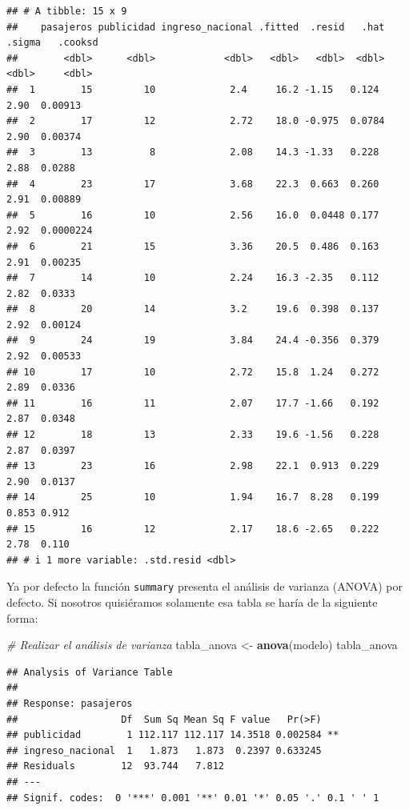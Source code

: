 \documentclass[
]{book}
\newenvironment{Shaded}{\begin{snugshade}}{\end{snugshade}}
\newcommand{\CommentTok}[1]{\textcolor[rgb]{0.56,0.35,0.01}{\textit{#1}}}
\newcommand{\FunctionTok}[1]{\textcolor[rgb]{0.13,0.29,0.53}{\textbf{#1}}}
\newcommand{\NormalTok}[1]{#1}
\newcommand{\OtherTok}[1]{\textcolor[rgb]{0.56,0.35,0.01}{#1}}
\begin{document}
\begin{verbatim}
## # A tibble: 15 x 9
##    pasajeros publicidad ingreso_nacional .fitted  .resid   .hat .sigma   .cooksd
##        <dbl>      <dbl>            <dbl>   <dbl>   <dbl>  <dbl>  <dbl>     <dbl>
##  1        15         10             2.4     16.2 -1.15   0.124   2.90  0.00913  
##  2        17         12             2.72    18.0 -0.975  0.0784  2.90  0.00374  
##  3        13          8             2.08    14.3 -1.33   0.228   2.88  0.0288   
##  4        23         17             3.68    22.3  0.663  0.260   2.91  0.00889  
##  5        16         10             2.56    16.0  0.0448 0.177   2.92  0.0000224
##  6        21         15             3.36    20.5  0.486  0.163   2.91  0.00235  
##  7        14         10             2.24    16.3 -2.35   0.112   2.82  0.0333   
##  8        20         14             3.2     19.6  0.398  0.137   2.92  0.00124  
##  9        24         19             3.84    24.4 -0.356  0.379   2.92  0.00533  
## 10        17         10             2.72    15.8  1.24   0.272   2.89  0.0336   
## 11        16         11             2.07    17.7 -1.66   0.192   2.87  0.0348   
## 12        18         13             2.33    19.6 -1.56   0.228   2.87  0.0397   
## 13        23         16             2.98    22.1  0.913  0.229   2.90  0.0137   
## 14        25         10             1.94    16.7  8.28   0.199   0.853 0.912    
## 15        16         12             2.17    18.6 -2.65   0.222   2.78  0.110    
## # i 1 more variable: .std.resid <dbl>
\end{verbatim}

Ya por defecto la función \texttt{summary} presenta el análisis de varianza (ANOVA) por defecto. Si nosotros quisiéramos solamente esa tabla se haría de la siguiente forma:

\begin{Shaded}
\begin{Highlighting}[]
\CommentTok{\# Realizar el análisis de varianza}
\NormalTok{tabla\_anova }\OtherTok{\textless{}{-}} \FunctionTok{anova}\NormalTok{(modelo)}
\NormalTok{tabla\_anova}
\end{Highlighting}
\end{Shaded}

\begin{verbatim}
## Analysis of Variance Table
## 
## Response: pasajeros
##                  Df  Sum Sq Mean Sq F value   Pr(>F)   
## publicidad        1 112.117 112.117 14.3518 0.002584 **
## ingreso_nacional  1   1.873   1.873  0.2397 0.633245   
## Residuals        12  93.744   7.812                    
## ---
## Signif. codes:  0 '***' 0.001 '**' 0.01 '*' 0.05 '.' 0.1 ' ' 1
\end{verbatim}
\end{document}
